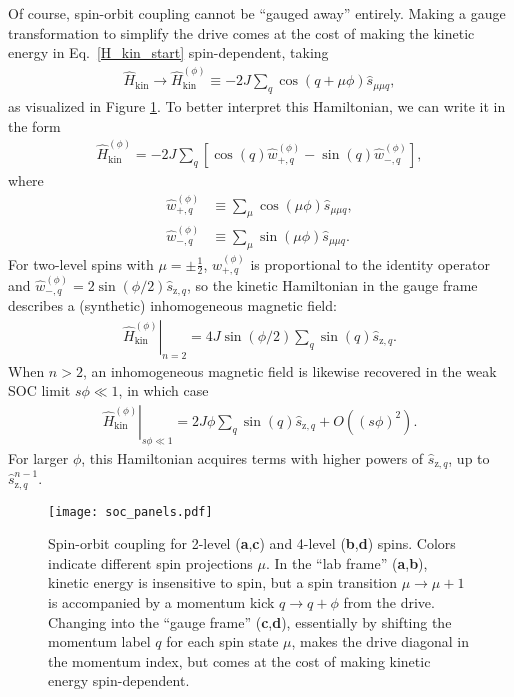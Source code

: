 \documentclass[aps,pra,nofootinbib,twocolumn,superscriptaddress]{revtex4-2}
\renewcommand{\t}{\text} %
\newcommand{\p}[1]{\left(#1\right)} %
\renewcommand{\sp}[1]{\left[#1\right]} %
\newcommand{\1}{\mathds{1}}
\newcommand{\s}{\hat{s}}
\renewcommand{\H}{\hat{H}}
\newcommand{\z}{\text{z}}
\begin{document}
Of course, spin-orbit coupling cannot be ``gauged away'' entirely.
Making a gauge transformation to simplify the drive comes at the cost of making the kinetic energy in Eq.~\eqref{H_kin_start} spin-dependent, taking
\begin{align}
  \H_{\t{kin}} \to \H_{\t{kin}}^{(\phi)}
  \equiv -2J \sum_q \cos\p{q+\mu\phi} \s_{\mu\mu q},
\end{align}
as visualized in Figure \ref{fig:soc_panels}.
To better interpret this Hamiltonian, we can write it in the form
\begin{align}
  \H_{\t{kin}}^{(\phi)}
  = -2J \sum_q
  \sp{\cos\p{q} \hat{w}_{+,q}^{(\phi)} - \sin\p{q} \hat{w}_{-,q}^{(\phi)}},
\end{align}
where
\begin{align}
  \hat{w}_{+,q}^{(\phi)} &\equiv \sum_\mu \cos\p{\mu\phi} \s_{\mu\mu q}, \\
  \hat{w}_{-,q}^{(\phi)} &\equiv \sum_\mu \sin\p{\mu\phi} \s_{\mu\mu q}.
\end{align}
For two-level spins with $\mu=\pm\frac12$, $\hat{w}_{+,q}^{(\phi)}$ is proportional to the identity operator and $\hat{w}_{-,q}^{(\phi)} = 2\sin\p{\phi/2} \s_{\z,q}$, so the kinetic Hamiltonian in the gauge frame describes a (synthetic) inhomogeneous magnetic field:
\begin{align}
  \left. \H_{\t{kin}}^{(\phi)} \right|_{n=2}
  = 4 J \sin\p{\phi/2} \sum_q \sin\p{q} \s_{\z,q}.
\end{align}
When $n>2$, an inhomogeneous magnetic field is likewise recovered in the weak SOC limit $s\phi\ll1$, in which case
\begin{align}
  \left. \H_{\t{kin}}^{(\phi)} \right|_{s\phi\ll1}
  = 2J\phi \sum_q \sin\p{q} \s_{\z,q} + O\p{(s\phi)^2}.
\end{align}
For larger $\phi$, this Hamiltonian acquires terms with higher powers of $\s_{\z,q}$, up to $\s_{\z,q}^{n-1}$.

\begin{figure}
\centering
\texttt{[image: soc\_panels.pdf]}
\caption{
Spin-orbit coupling for 2-level ({\bf a},{\bf c}) and 4-level ({\bf b},{\bf d}) spins.
Colors indicate different spin projections $\mu$.
In the ``lab frame'' ({\bf a},{\bf b}), kinetic energy is insensitive to spin, but a spin transition $\mu\to\mu+1$ is accompanied by a momentum kick $q\to q+\phi$ from the drive.
Changing into the ``gauge frame'' ({\bf c},{\bf d}), essentially by shifting the momentum label $q$ for each spin state $\mu$, makes the drive diagonal in the momentum index, but comes at the cost of making kinetic energy spin-dependent.
}
\label{fig:soc_panels}
\end{figure}
\end{document}

